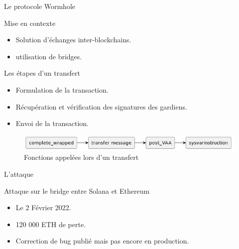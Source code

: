 \begin{frame}{Le protocole Wormhole}
    \begin{block}{Mise en contexte}
        \begin{itemize}
            \item Solution d'échanges inter-blockchains.
            \item utilisation de bridges.
        \end{itemize}
    \end{block}
    \pause
    \begin{block}{Les étapes d'un transfert}
        \begin{itemize}
            \item Formulation de la transaction.
            \item Récupération et vérification des signatures des gardiens.
            \item Envoi de la transaction.
        \end{itemize}
    \end{block}
    \begin{figure}
        \centering
        \includegraphics[scale = 0.3]{centralisation/img/fonctions.png}
        \caption{Fonctions appelées lors d'un transfert}
    \end{figure}
\end{frame}

\begin{frame}{L'attaque}
    \begin{block}{Attaque sur le bridge entre Solana et Ethereum}
        \begin{itemize}
            \item Le 2 Février 2022.
            \item 120 000 ETH de perte.
            \item Correction de bug publié mais pas encore en production.
        \end{itemize}
    \end{block}
\end{frame}

